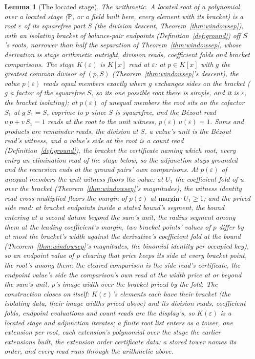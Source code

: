 \documentclass[11pt]{article}
\newtheorem{lemma}{Lemma}
\theoremstyle{definition}
\begin{document}
\begin{lemma}[The located stage]\label{lem:stage}
\emph{The arithmetic.} A \emph{located root} of a polynomial over a
\emph{located stage} ($\mathbb P$, or a field built here, every element
with its bracket) is a root
$\varepsilon$ of its squarefree part $S$ (the division
descent, Theorem~\ref{thm:windowsep}),
with an isolating bracket of balance-pair endpoints
(Definition~\ref{def:ground}) off $S$'s roots, narrower
than half the separation of Theorem~\ref{thm:windowsep}, whose
derivation is stage arithmetic outright, division reads,
coefficient folds and bracket comparisons. The stage $K(\varepsilon)$ is $K[x]$
read at $\varepsilon$: at $p\in K[x]$ with $g$ the greatest common
divisor of $(p,S)$ (Theorem~\ref{thm:windowsep}'s descent), the value
$p(\varepsilon)$ reads equal members exactly where $g$ exchanges sides on the bracket
($g$ a factor of the squarefree $S$, so its one possible root there is simple,
and it is $\varepsilon$, the bracket isolating); at $p(\varepsilon)$
of unequal members
the root sits on the cofactor $S_1$ at $g\,S_1=S$, coprime to $p$ since $S$ is
squarefree, and the B\'ezout read $u\,p+v\,S_1=1$ reads at the root
to the \emph{unit witness}, $p(\varepsilon)\,u(\varepsilon)=1$.
Sums and products
are remainder reads, the division at $S$, a value's unit is
the B\'ezout read's witness,
and a value's side at the root is a count read
(Definition~\ref{def:ground}), the bracket the certificate naming
which root, every entry an elimination read of the stage below, so
the adjunction stays grounded and the recursion ends at the ground
pairs' own comparisons. At $p(\varepsilon)$ of unequal members the
unit witness floors the value: at $U_1$ the coefficient
fold of $u$ over the bracket (Theorem~\ref{thm:windowsep}'s
magnitudes), the
witness identity read cross-multiplied floors the margin of
$p(\varepsilon)$ at $\mathrm{margin}\cdot U_1\ge1$; and the
\emph{priced side read}: at bracket endpoints inside a stated
bound's segment, the bound entering at a second datum beyond the
sum's unit, the radius segment among them at the leading
coefficient's margin, two bracket
points' values of $p$ differ by at most the bracket's width against
the derivative's coefficient fold at the bound
(Theorem~\ref{thm:windowsep}'s magnitudes, the binomial identity
per occupied key), so an endpoint value of $p$ clearing that price
keeps its side at every bracket point, the root's among them: the
cleared comparison is the side read's certificate, the endpoint
value's side the comparison's own read at the width price at or
beyond the sum's unit, $p$'s image width over the bracket priced
by the fold. The construction closes on itself: $K(\varepsilon)$'s elements each
have their bracket (the isolating data, their image widths priced
above) and its division reads, coefficient folds, endpoint
evaluations and count reads
are the
display's, so $K(\varepsilon)$ is a located stage and adjunction
iterates; a finite root list enters as a \emph{tower}, one
extension per root, each extension's polynomial over the stage the
earlier extensions built, the extension order certificate data: a
stored tower names its
order, and every read runs through the arithmetic above.

\end{lemma}
\end{document}
